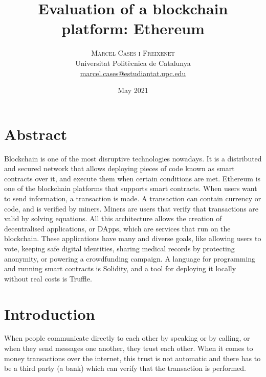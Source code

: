 \documentclass[10pt]{article}
\begin{document}
\title{%
	\huge\bfseries Evaluation of a blockchain platform: Ethereum \\
}
\date{\normalsize May 2021}
\author{
	{\scshape Marcel Cases i Freixenet} \\
	{\normalsize Universitat Politècnica de Catalunya} \\
	{\normalsize\href{mailto:marcel.cases@estudiantat.upc.edu}{marcel.cases@estudiantat.upc.edu}}
}

\maketitle

\begin{multicols}{2}
	
\section*{Abstract}


Blockchain is one of the most disruptive technologies nowadays. It is a distributed and secured network that allows deploying pieces of code known as smart contracts over it, and execute them when certain conditions are met. Ethereum is one of the blockchain platforms that supports smart contracts. When users want to send information, a transaction is made. A transaction can contain currency or code, and is verified by miners. Miners are users that verify that transactions are valid by solving equations. All this architecture allows the creation of decentralised applications, or DApps, which are services that run on the blockchain. These applications have many and diverse goals, like allowing users to vote, keeping safe digital identities, sharing medical records by protecting anonymity, or powering a crowdfunding campaign. A language for programming and running smart contracts is Solidity, and a tool for deploying it locally without real costs is Truffle.

\section{Introduction}

When people communicate directly to each other by speaking or by calling, or when they send messages one another, they trust each other. When it comes to money transactions over the internet, this trust is not automatic and there has to be a third party (a bank) which can verify that the transaction is performed.\\


\end{multicols}
\end{document}
